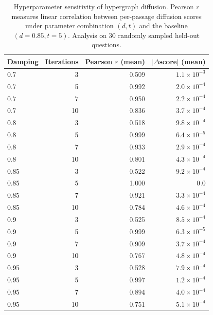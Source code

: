 \begin{table}[t]
\centering
\small
\caption{Hyperparameter sensitivity of hypergraph diffusion. Pearson $r$ measures linear correlation between per-passage diffusion scores under parameter combination $(d, t)$ and the baseline $(d=0.85, t=5)$. Analysis on 30 randomly sampled held-out questions.}
\label{tab:hyperparameter-sensitivity}
\begin{tabular}{lrrr}
\toprule
Damping & Iterations & Pearson $r$ (mean) & $|\Delta$score$|$ (mean) \\
\midrule
0.7 & 3 & 0.509 & $1.1 \times 10^{-3}$ \\
0.7 & 5 & 0.992 & $2.0 \times 10^{-4}$ \\
0.7 & 7 & 0.950 & $2.2 \times 10^{-4}$ \\
0.7 & 10 & 0.836 & $3.7 \times 10^{-4}$ \\
0.8 & 3 & 0.518 & $9.8 \times 10^{-4}$ \\
0.8 & 5 & 0.999 & $6.4 \times 10^{-5}$ \\
0.8 & 7 & 0.933 & $2.9 \times 10^{-4}$ \\
0.8 & 10 & 0.801 & $4.3 \times 10^{-4}$ \\
0.85 & 3 & 0.522 & $9.2 \times 10^{-4}$ \\
0.85 & 5 & 1.000 & 0.0 \\
0.85 & 7 & 0.921 & $3.3 \times 10^{-4}$ \\
0.85 & 10 & 0.784 & $4.6 \times 10^{-4}$ \\
0.9 & 3 & 0.525 & $8.5 \times 10^{-4}$ \\
0.9 & 5 & 0.999 & $6.3 \times 10^{-5}$ \\
0.9 & 7 & 0.909 & $3.7 \times 10^{-4}$ \\
0.9 & 10 & 0.767 & $4.8 \times 10^{-4}$ \\
0.95 & 3 & 0.528 & $7.9 \times 10^{-4}$ \\
0.95 & 5 & 0.997 & $1.2 \times 10^{-4}$ \\
0.95 & 7 & 0.894 & $4.0 \times 10^{-4}$ \\
0.95 & 10 & 0.751 & $5.1 \times 10^{-4}$ \\
\bottomrule
\end{tabular}
\end{table}
